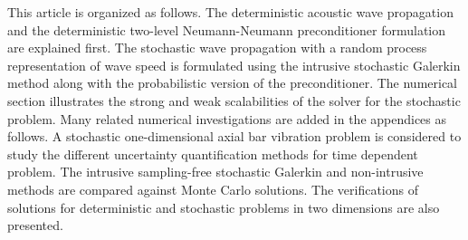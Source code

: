 \documentclass{article}
\begin{document}
\textcolor{ss}{This article is organized as follows. The deterministic acoustic wave propagation and the deterministic two-level Neumann-Neumann preconditioner formulation are explained first. The stochastic wave propagation with a random process representation of wave speed is formulated using the intrusive stochastic Galerkin method along with the probabilistic version of the preconditioner. The numerical section illustrates the strong and weak scalabilities of the solver for the stochastic problem. Many related numerical investigations are added in the appendices as follows. A stochastic one-dimensional axial bar vibration problem is considered to study the different uncertainty quantification methods for time dependent problem. The intrusive sampling-free stochastic Galerkin and non-intrusive methods are compared against Monte Carlo solutions. The verifications of solutions for deterministic and stochastic problems in two dimensions are also presented.}
\end{document}

